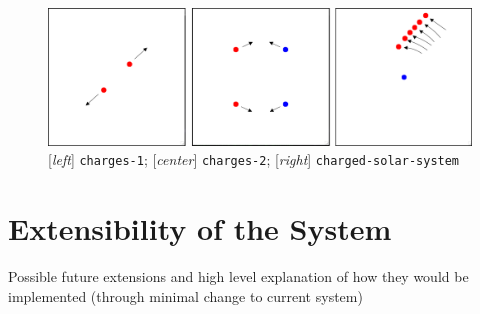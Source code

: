 \documentclass{article}
\begin{document}
\begin{figure}[h!]
  \centering
 \includegraphics[width=\textwidth,height=\textheight,keepaspectratio]{figs/charges.png}
  \caption{[\textit{left}] \texttt{charges-1}; [\textit{center}] \texttt{charges-2}; [\textit{right}] \texttt{charged-solar-system}}
  \label{figure:charges}
\end{figure}


\section{Extensibility of the System}

Possible future extensions and high level explanation of how they would be
implemented (through minimal change to current system)
\end{document}
